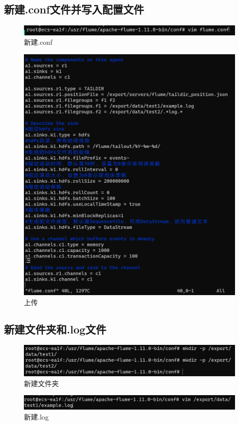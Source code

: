 \subsection{新建.conf文件并写入配置文件}
\begin{figure}[H]
  \centering
  \includegraphics[width=\textwidth]{figure/新建.conf.png}
  \caption{新建.conf}
  \label{fig:my_label}
\end{figure}
\begin{figure}[H]
  \centering
  \includegraphics[width=\textwidth]{figure/配置文件.png}
  \caption{上传}
  \label{fig:my_label}
\end{figure}

\subsection{新建文件夹和.log文件}
\begin{figure}[H]
  \centering
  \includegraphics[width=\textwidth]{figure/新建文件夹.png}
  \caption{新建文件夹}
  \label{fig:my_label}
\end{figure}
\begin{figure}[H]
  \centering
  \includegraphics[width=\textwidth]{figure/新建.log.png}
  \caption{新建.log}
  \label{fig:my_label}
\end{figure}

